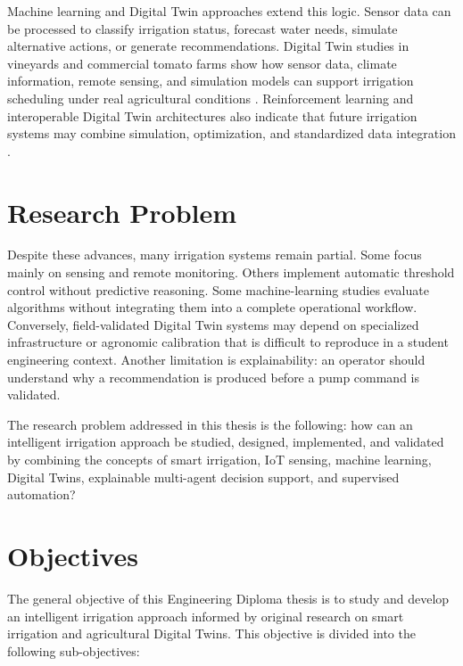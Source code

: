 Machine learning and Digital Twin approaches extend this logic. Sensor data can be processed to classify irrigation status, forecast water needs, simulate alternative actions, or generate recommendations. Digital Twin studies in vineyards and commercial tomato farms show how sensor data, climate information, remote sensing, and simulation models can support irrigation scheduling under real agricultural conditions \cite{bellvert2023vineyarddt,millan2025tomatodt}. Reinforcement learning and interoperable Digital Twin architectures also indicate that future irrigation systems may combine simulation, optimization, and standardized data integration \cite{elhachimi2025collectiveirrigationdt,kallenberg2025interoperabledt}.

\section*{Research Problem}

Despite these advances, many irrigation systems remain partial. Some focus mainly on sensing and remote monitoring. Others implement automatic threshold control without predictive reasoning. Some machine-learning studies evaluate algorithms without integrating them into a complete operational workflow. Conversely, field-validated Digital Twin systems may depend on specialized infrastructure or agronomic calibration that is difficult to reproduce in a student engineering context. Another limitation is explainability: an operator should understand why a recommendation is produced before a pump command is validated.

The research problem addressed in this thesis is the following: how can an intelligent irrigation approach be studied, designed, implemented, and validated by combining the concepts of smart irrigation, IoT sensing, machine learning, Digital Twins, explainable multi-agent decision support, and supervised automation?

\section*{Objectives}

The general objective of this Engineering Diploma thesis is to study and develop an intelligent irrigation approach informed by original research on smart irrigation and agricultural Digital Twins. This objective is divided into the following sub-objectives:

